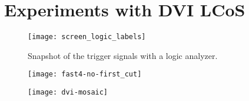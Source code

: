 \chapter{Experiments with DVI LCoS}
\begin{figure}[!hbt]
  \centering
  \texttt{[image: screen\_logic\_labels]}
  \caption{Snapshot of the trigger signals with a logic analyzer.}
  \label{fig:screen_logic_labels}
\end{figure}

\begin{figure}[!hbt]
  \centering
  \texttt{[image: fast4-no-first\_cut]}
  \caption{}
  \label{fig:fast4-no-first_cut}
\end{figure}


\begin{figure}[!hbt]
  \centering
  \texttt{[image: dvi-mosaic]}
  \caption{}
  \label{fig:dvi-mosaic}
\end{figure}

